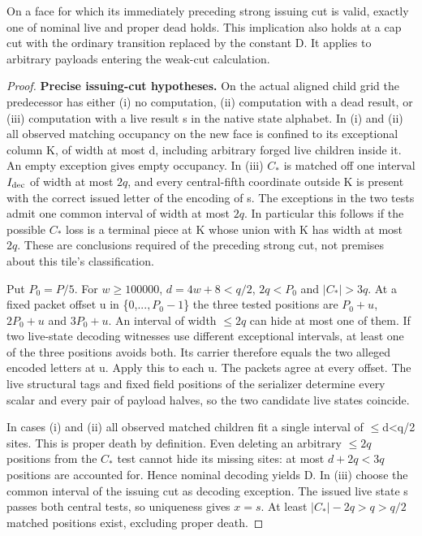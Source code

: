 \begin{lemma}\label{lem:classification}
On a face for which its immediately preceding strong issuing cut is valid, exactly one of nominal live and proper dead holds. This implication also holds at a cap cut with the ordinary transition replaced by the constant D. It applies to arbitrary payloads entering the weak-cut calculation.
\end{lemma}
\begin{proof}


\textbf{Precise issuing-cut hypotheses.} On the actual aligned child grid the predecessor has either (i) no computation, (ii) computation with a dead result, or (iii) computation with a live result s in the native state alphabet. In (i) and (ii) all observed matching occupancy on the new face is confined to its exceptional column K, of width at most d, including arbitrary forged live children inside it. An empty exception gives empty occupancy. In (iii) \(C_*\) is matched off one interval \(I_{\rm dec}\) of width at most \(2q\), and every central-fifth coordinate outside K is present with the correct issued letter of the encoding of s. The exceptions in the two tests admit one common interval of width at most \(2q\). In particular this follows if the possible \(C_*\) loss is a terminal piece at K whose union with K has width at most \(2q\). These are conclusions required of the preceding strong cut, not premises about this tile's classification.

Put \(P_0=P/5\). For \(w\ge 100000\), \(d=4w+8<q/2\), \(2q<P_0\) and \(|C_*|>3q\). At a fixed packet offset u in \{0,...\(,P_0- 1\)\} the three tested positions are \(P_0+u\), \(2P_0+u\) and \(3P_0+u\). An interval of width \(\le\)\(2q\) can hide at most one of them. If two live-state decoding witnesses use different exceptional intervals, at least one of the three positions avoids both. Its carrier therefore equals the two alleged encoded letters at u. Apply this to each u. The packets agree at every offset. The live structural tags and fixed field positions of the serializer determine every scalar and every pair of payload halves, so the two candidate live states coincide.

In cases (i) and (ii) all observed matched children fit a single interval of \(\le\)d\textless{}q/2 sites. This is proper death by definition. Even deleting an arbitrary \(\le\)\(2q\) positions from the \(C_*\) test cannot hide its missing sites: at most \(d+2q<3q\) positions are accounted for. Hence nominal decoding yields D. In (iii) choose the common interval of the issuing cut as decoding exception. The issued live state s passes both central tests, so uniqueness gives \(x=s\). At least \(|C_*|- 2q>q>q/2\) matched positions exist, excluding proper death.


\end{proof}
